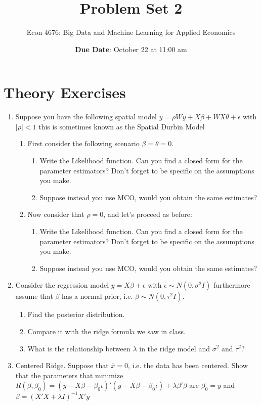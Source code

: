 \documentclass[12pt,onecolumn]{article}
\title{Problem Set 2}
\subtitle{Econ 4676: Big Data and Machine Learning for Applied Economics}
\author{{\bf Due Date}: October 22 at 11:00 am}
\date{}
\begin{document}
\maketitle

\section{Theory Exercises}

\begin{enumerate}
  \item Suppose you have the following spatial model $y=\rho W y + X\beta + WX\theta  +\epsilon$ with $|\rho|<1$  this is sometimes known as the Spatial Durbin Model
  \begin{enumerate}
    \item First consider the following scenario  $\beta=\theta=0$. 
    \begin{enumerate}
      \item Write the Likelihood function. Can you find a closed form for the parameter estimators? Don't forget to be specific on the assumptions you make.
      \item Suppose instead you use MCO, would you obtain the same estimates? 
    \end{enumerate}  
    \item Now consider that $\rho=0$, and let's proceed as before:
    \begin{enumerate}
      \item Write the Likelihood function. Can you find a closed form for the parameter estimators? Don't forget to be specific on the assumptions you make.
      \item Suppose instead you use MCO, would you obtain the same estimates? 
  \end{enumerate}  
  \end{enumerate}  
  \item Consider the regression model $y=X\beta +\epsilon$ with $\epsilon\sim N(0,\sigma^2I)$ furthermore assume that $\beta$ has a normal prior, i.e. $\beta\sim N(0,\tau^2I)$. 
\begin{enumerate}
    \item Find the posterior distribution. 
    \item Compare it with the ridge formula we saw in class. 
    \item What is the relationship between $\lambda$ in the ridge model and $\sigma^2$ and $\tau^2$?
\end{enumerate}
  \item Centered Ridge. Suppose that $\bar x= 0$, i.e. the data has been centered. Show that the parameters that minimize $R(\beta,\beta_0) = (y-X\beta-\beta_0 \iota)'(y-X\beta-\beta_0 \iota)+ \lambda\beta'\beta$ are $\beta_0=\bar y$ and $\beta=(X'X+\lambda I)^{-1}X'y$


\end{enumerate}
\end{document}
